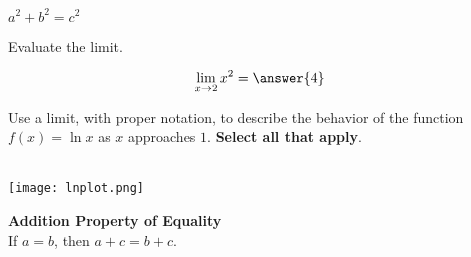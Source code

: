 \documentclass{ximera}
\begin{document}
\begin{definition}
    $a^2+b^2 = c^2$
\end{definition}    


\begin{exercise}
Evaluate the limit.

\[ \lim\limits_{x \to 2} x^2 = \answer{4} \]

\end{exercise}


\begin{question} Use a limit, with proper notation, to describe the behavior of the function $f(x)=\ln x$ as $x$ approaches $1.$  \textbf{Select all that apply}. \\ \\

    \begin{center} 
        \texttt{[image: lnplot.png]}
    \end{center}

\begin{selectAll}
    \end{selectAll}
    \end{question}

\begin{theorem}

\textbf{Addition Property of Equality} \\ 

If \( a = b \), then \( a + c = b + c \).
\end{theorem}
\end{document}
